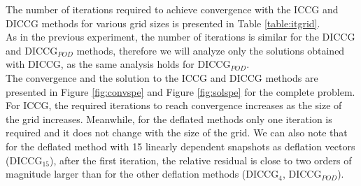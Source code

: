 \documentclass[12pt]{article}
\begin{document}
The number of iterations required to achieve convergence with the ICCG and DICCG methods for various
grid sizes is presented in Table \ref{table:itgrid}. \\
As in the previous experiment, the number of iterations is similar for the DICCG and DICCG$_{POD}$ methods,
therefore we will analyze only the solutions obtained with DICCG, as the same analysis holds for DICCG$_{POD}$.
\\The convergence and the solution to the ICCG and DICCG methods are presented in Figure \ref{fig:convspe} and Figure \ref{fig:solspe} for the complete problem. 
For ICCG, the required iterations to reach convergence increases as the size of the grid increases. Meanwhile, for the deflated methods only one iteration is required and it does not change with the size of the grid.
We can also note that for the deflated method with 15 linearly dependent snapshots as deflation vectors (DICCG$_{15}$), after the first iteration, the relative residual is close to two orders of magnitude larger than for the other deflation methods (DICCG$_{4}$, DICCG$_{POD}$).   
\end{document}
